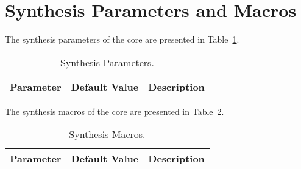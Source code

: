 \section{Synthesis Parameters and Macros}
\label{sec:sp}

The synthesis parameters of the core are presented in Table~\ref{tab:sp}.

\begin{table}[H]
  \centering
    \begin{tabularx}{\textwidth}{ | c | c | X | }
    \hline
    \rowcolor{iob-green}
    {\bf Parameter} & {\bf Default Value} & {\bf Description} \\\hline

    

    \end{tabularx}
  \caption{Synthesis Parameters.}
  \label{tab:sp}
\end{table}

The synthesis macros of the core are presented in Table~\ref{tab:sm}.

\begin{table}[H]
  \centering
    \begin{tabularx}{\textwidth}{ | c | c | X | }
    \hline
    \rowcolor{iob-green}
    {\bf Parameter} & {\bf Default Value} & {\bf Description} \\\hline

    

    \end{tabularx}
  \caption{Synthesis Macros.}
  \label{tab:sm}
\end{table}
